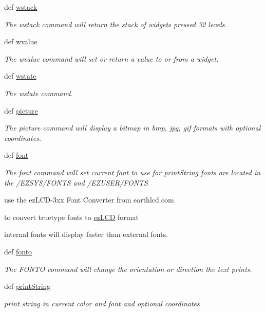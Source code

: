 \begin{DoxyCompactItemize}
def \hyperlink{group___widgets_ga223301539fa77d634fc44b480a08f6a7}{wstack}
\begin{DoxyCompactList}\small\item\em The wstack command will return the stack of widgets pressed 32 levels. \end{DoxyCompactList}\item 
def \hyperlink{group___widgets_ga57c35a2e95d92bbeaeefc71ffd9998fc}{wvalue}
\begin{DoxyCompactList}\small\item\em The wvalue command will set or return a value to or from a widget. \end{DoxyCompactList}\item 
def \hyperlink{group___widgets_ga68f19c87c7284b550f150b81327125aa}{wstate}
\begin{DoxyCompactList}\small\item\em The wstate command. \end{DoxyCompactList}\item 
def \hyperlink{group___bitmap_font_ga675ef467cb7a69ab8c19024bfd0775d6}{picture}
\begin{DoxyCompactList}\small\item\em The picture command will display a bitmap in bmp, jpg, gif formats with optional coordinates. \end{DoxyCompactList}\item 
def \hyperlink{group___bitmap_font_gaf4cf49efa8ac77f85a27f2bafe6b80cf}{font}
\begin{DoxyCompactList}\small\item\em The font command will set current font to use for print\-String fonts are located in the /\-E\-Z\-S\-Y\-S/\-F\-O\-N\-T\-S and /\-E\-Z\-U\-S\-E\-R/\-F\-O\-N\-T\-S \par
 use the ez\-L\-C\-D-\/3xx Font Converter from earthlcd.\-com \par
 to convert truetype fonts to \hyperlink{classmodule_1_1ez_l_c_d3xx_1_1ez_l_c_d}{ez\-L\-C\-D} format \par
 internal fonts will display faster than external fonts. \end{DoxyCompactList}\item 
def \hyperlink{group___bitmap_font_ga9e4a0699fcde7bdd65fd97720b60b3d3}{fonto}
\begin{DoxyCompactList}\small\item\em The F\-O\-N\-T\-O command will change the orientation or direction the text prints. \end{DoxyCompactList}\item 
def \hyperlink{group___bitmap_font_ga9156f7c9f1239d24a3a8a7ade64291d8}{print\-String}
\begin{DoxyCompactList}\small\item\em print string in current color and font and optional coordinates \end{DoxyCompactList}\end{DoxyCompactItemize}
